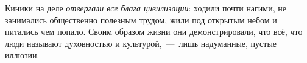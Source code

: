 
Киники на деле \textit{отвергали все блага цивилизации}: ходили почти нагими, не занимались общественно полезным трудом, жили под открытым небом и питались чем попало. Своим образом жизни они демонстрировали, что всё, что люди называют духовностью и культурой,~---~лишь надуманные, пустые иллюзии.


